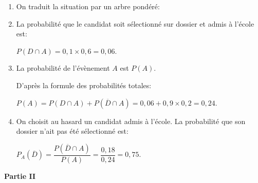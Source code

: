\begin{enumerate}
\item On traduit la situation par un arbre pondéré:

\begin{center}
{%
{}
\pstree[treemode=R,nodesepA=0pt]%
       {\TR{}}
       {
	                        {
	                        }
	                        {
	                        }
      }
}
\bigskip
\end{center}

\item La probabilité que le candidat soit sélectionné sur dossier et admis à l'école est:

$P(D\cap A)=0,1\times 0,6=0,06$.

\item La probabilité de l'évènement  $A$ est $P(A)$.

D'après la formule des probabilités totales:

$P(A) = P(D\cap A) + P(\overline{D}\cap A) = 0,06 + 0,9\times 0,2 = 0,24$.

\item On choisit au hasard un candidat admis à l'école. La probabilité que son dossier n'ait pas été sélectionné est:

$P_A(\overline{D}) = \dfrac{P(\overline{D}\cap A)}{P(A)} = \dfrac{0,18}{0,24}=0,75$.
\end{enumerate}


\begin{center}
\textbf{Partie II}
\end{center}

